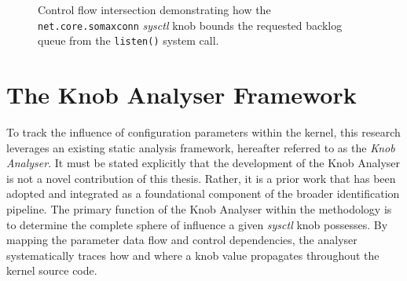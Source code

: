 \begin{figure}[htbp]
{
    }
    \caption{Control flow intersection demonstrating how the \texttt{net.core.somaxconn} \textit{sysctl} knob bounds the requested backlog queue from the \texttt{listen()} system call.}
    \label{fig:somaxconn_intersection}
\end{figure}

\section{The Knob Analyser Framework}

To track the influence of configuration parameters within the kernel, this research leverages an existing static analysis framework, hereafter referred to as the \textit{Knob Analyser}.
It must be stated explicitly that the development of the Knob Analyser is not a novel contribution of this thesis.
Rather, it is a prior work that has been adopted and integrated as a foundational component of the broader identification pipeline.
The primary function of the Knob Analyser within the methodology is to determine the complete sphere of influence a given \textit{sysctl} knob possesses.
By mapping the parameter data flow and control dependencies, the analyser systematically traces how and where a knob value propagates throughout the kernel source code.

